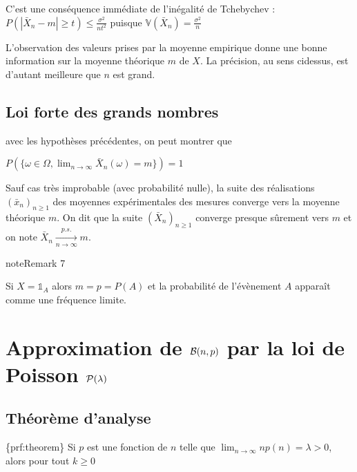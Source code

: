 \documentclass[letterpaper,10pt,french]{sphinxmanual}
\begin{document}
\sphinxAtStartPar
C’est une conséquence immédiate de l’inégalité de Tchebychev : \(P(|\bar{X}_n-m|\geq t)\leq\frac{\sigma^2}{nt^2}\) puisque \(\mathbb{V}(\bar{X}_n)=\frac{\sigma^2}{n}\)

\sphinxAtStartPar
L’observation des valeurs prises par la moyenne empirique donne une bonne information sur la moyenne théorique \(m\) de \(X\). La précision, au sens ci\sphinxhyphen{}dessus, est d’autant meilleure que \(n\) est grand.


\subsection{Loi forte des grands nombres}
\label{\detokenize{elemstats:loi-forte-des-grands-nombres}}
\sphinxAtStartPar
avec les hypothèses précédentes, on peut montrer que

\sphinxAtStartPar
\(P(\{\omega\in\Omega, \displaystyle\lim_{n\rightarrow\infty} \bar{X}_n(\omega)=m\})=1\)

\sphinxAtStartPar
Sauf cas très improbable (avec probabilité nulle), la suite des réalisations \((\bar{x}_n)_{n\geq 1}\) des moyennes expérimentales des mesures converge vers la moyenne théorique \(m\). On dit que la suite \((\bar{X}_n)_{n\geq 1}\) converge presque sûrement vers \(m\) et on note \(\bar{X}_n\xrightarrow[n\rightarrow\infty]{p.s.} m\).
\label{elemstats:remark-7}
\begin{sphinxadmonition}{note}{Remark 7}



\sphinxAtStartPar
Si \(X=\mathbb{1}_A\) alors \(m=p=P(A)\) et la probabilité de l’évènement \(A\) apparaît comme une fréquence limite.
\end{sphinxadmonition}


\section{Approximation de \protect\(\mathcal{B}(n,p)\protect\) par la loi de Poisson \protect\(\mathcal P(\lambda)\protect\)}
\label{\detokenize{elemstats:approximation-de-mathcal-b-n-p-par-la-loi-de-poisson-mathcal-p-lambda}}

\subsection{Théorème d’analyse}
\label{\detokenize{elemstats:theoreme-d-analyse}}
\sphinxAtStartPar
\textasciigrave{}\textasciigrave{}\textasciigrave{}\textasciigrave{}\{prf:theorem\}\textasciigrave{}
Si \(p\) est une fonction de \(n\) telle que \(\displaystyle\lim_{n\rightarrow\infty}np(n)=\lambda>0\), alors pour tout \(k\geq 0\)
\end{document}
